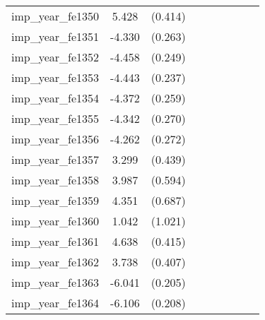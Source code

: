 {\begin{tabular}{l*{4}{cc}}
imp\_year\_fe1350&    5.428\sym{***}&  (0.414)&                  &         &                  &         &                  &         \\
imp\_year\_fe1351&   -4.330\sym{***}&  (0.263)&                  &         &                  &         &                  &         \\
imp\_year\_fe1352&   -4.458\sym{***}&  (0.249)&                  &         &                  &         &                  &         \\
imp\_year\_fe1353&   -4.443\sym{***}&  (0.237)&                  &         &                  &         &                  &         \\
imp\_year\_fe1354&   -4.372\sym{***}&  (0.259)&                  &         &                  &         &                  &         \\
imp\_year\_fe1355&   -4.342\sym{***}&  (0.270)&                  &         &                  &         &                  &         \\
imp\_year\_fe1356&   -4.262\sym{***}&  (0.272)&                  &         &                  &         &                  &         \\
imp\_year\_fe1357&    3.299\sym{***}&  (0.439)&                  &         &                  &         &                  &         \\
imp\_year\_fe1358&    3.987\sym{***}&  (0.594)&                  &         &                  &         &                  &         \\
imp\_year\_fe1359&    4.351\sym{***}&  (0.687)&                  &         &                  &         &                  &         \\
imp\_year\_fe1360&    1.042         &  (1.021)&                  &         &                  &         &                  &         \\
imp\_year\_fe1361&    4.638\sym{***}&  (0.415)&                  &         &                  &         &                  &         \\
imp\_year\_fe1362&    3.738\sym{***}&  (0.407)&                  &         &                  &         &                  &         \\
imp\_year\_fe1363&   -6.041\sym{***}&  (0.205)&                  &         &                  &         &                  &         \\
imp\_year\_fe1364&   -6.106\sym{***}&  (0.208)&                  &         &                  &         &                  &         \\

\end{tabular}}
